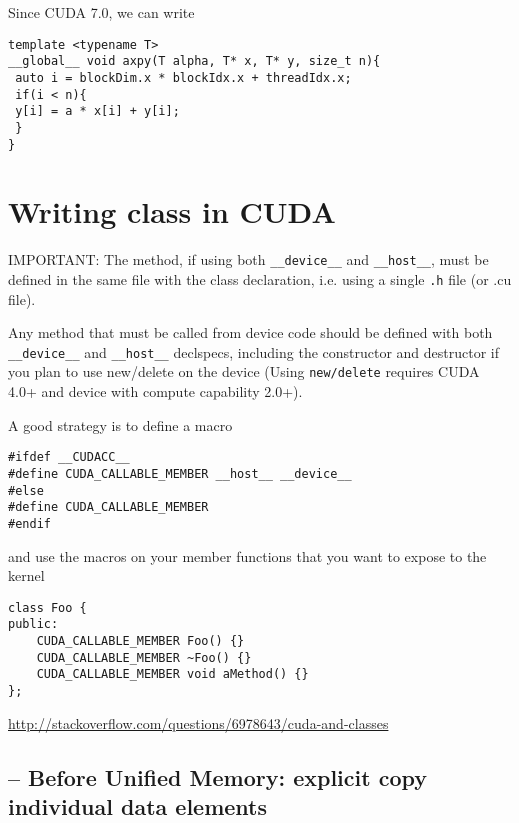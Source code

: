 Since CUDA 7.0, we can write
\begin{verbatim}
template <typename T>
__global__ void axpy(T alpha, T* x, T* y, size_t n){
 auto i = blockDim.x * blockIdx.x + threadIdx.x;
 if(i < n){
 y[i] = a * x[i] + y[i];
 }
}
\end{verbatim}

\section{Writing class in CUDA}

IMPORTANT: The method, if using both \verb!__device__! and \verb!__host__!,
must be defined in the same file with the class declaration, i.e. using a single
\verb!.h! file (or .cu file).


Any method that must be called from device code should be defined with both
\verb!__device__! and \verb!__host__! declspecs, including the constructor and
destructor if you plan to use new/delete on the device (Using \verb!new/delete!
requires CUDA 4.0+ and device with compute capability 2.0+).

A good strategy is to define a macro
\begin{verbatim}
#ifdef __CUDACC__
#define CUDA_CALLABLE_MEMBER __host__ __device__
#else
#define CUDA_CALLABLE_MEMBER
#endif 
\end{verbatim}

and use the macros on your member functions that you want to expose to the
kernel
\begin{verbatim}
class Foo {
public:
    CUDA_CALLABLE_MEMBER Foo() {}
    CUDA_CALLABLE_MEMBER ~Foo() {}
    CUDA_CALLABLE_MEMBER void aMethod() {}
};
\end{verbatim}

\url{http://stackoverflow.com/questions/6978643/cuda-and-classes}

\subsection{-- Before Unified Memory: explicit copy individual data elements}

